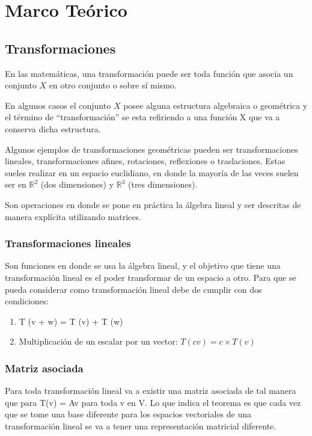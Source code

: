 \documentclass[a4paper]{article}
\begin{document}
\newpage
\section{Marco Teórico}

\subsection{Transformaciones}
En las matemáticas, una transformación puede ser toda función que asocia un
conjunto $X$ en otro conjunto o sobre sí mismo.

En algunos casos el conjunto $X$ posee alguna estructura algebraica o
geométrica
y el término de “transformación” se esta refiriendo a una función X que va a
conserva dicha estructura.

Algunos ejemplos de transformaciones geométricas pueden ser transformaciones
lineales,  transformaciones afines, rotaciones, reflexiones o traslaciones.
Estas sueles realizar en un espacio euclidiano, en donde la mayoría de las
veces suelen ser en $\mathbb{R}^2$ (dos dimensiones) y $\mathbb{R}^3$ (tres
dimensiones).

Son operaciones en donde se pone en práctica la álgebra lineal y ser descritas
de manera explícita utilizando matrices.

\subsubsection{Transformaciones lineales}
Son funciones en donde se usa la álgebra lineal, y el objetivo que tiene una
transformación lineal es el poder transformar de un espacio a otro.
Para que se pueda considerar como transformación lineal debe de cumplir con dos
condiciones:
\begin{enumerate}
    \item T (v + w) = T (v) + T (w)
    \item Multiplicación de un escalar por un vector: $T (cv) = c \times T (v)$
\end{enumerate}


\subsubsection{Matriz asociada}
Para toda transformación lineal va a existir una matriz asociada de tal manera
que para T(v) = Av para toda v en V.
Lo que indica el teorema es que cada vez que se tome una base diferente para
los espacios vectoriales de una transformación lineal se va a tener una
representación matricial diferente.
\end{document}

